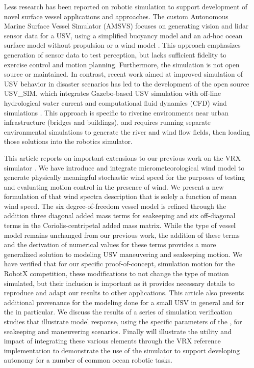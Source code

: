 \documentclass[utf8]{frontiersSCNS} %
\begin{document}
Less research has been reported on robotic simulation to support development of novel surface vessel applications and approaches. The custom Autonomous Marine Surface Vessel Simulator (AMSVS) focuses on generating vision and lidar sensor data for a USV, using a simplified buoyancy model and an ad-hoc ocean surface model without propulsion or a wind model \citep{smith19high}. This approach emphasizes generation of sensor data to test perception, but lacks sufficient fidelity to exercise control and motion planning. Furthermore, the simulation is not open source or maintained. In contrast, recent work aimed at improved simulation of USV behavior in disaster scenarios has led to the development of the open source USV\_SIM, which integrates Gazebo-based USV simulation with off-line hydrological water current and computational fluid dynamics (CFD) wind simulations \citep{paravisi2019unmanned}. This approach is specific to riverine environments near urban infrastructure (bridges and buildings), and requires running separate environmental simulations to generate the river and wind flow fields, then loading those solutions into the robotics simulator.


This article reports on important extensions to our previous work on the VRX simulator \citep{bingham19toward}.  We have introduce and integrate micrometeorological wind model to generate physically meaningful stochastic wind speed for the purposes of testing and evaluating motion control in the presence of wind.  We present a new formulation of that wind spectra description that is solely a function of mean wind speed. The six degree-of-freedom vessel model is refined through the addition three diagonal added mass terms for seakeeping and six off-diagonal terms in the Coriolis-centripetal added mass matrix.   While the type of vessel model remains unchanged from our previous work, the addition of these terms and the derivation of numerical values for these terms provides a more generalized solution to modeling USV maneuvering and seakeeping motion.  We have verified that for our specific proof-of-concept, simulation \wamv{} motion for the RobotX competition, these modifications to not change the type of motion simulated, but their inclusion is important as it provides necessary details to reproduce and adapt our results to other applications.  This article also presents additional provenance for the modeling done for a small USV in general and for the \wamv{} in particular.  We discuss the results of a series of simulation verification studies that illustrate model response, using the specific parameters of the \wamv, for seakeeping and maneuvering scenarios.  Finally will illustrate the utility and impact of integrating these various elements through the VRX reference implementation to demonstrate the use of the simulator to support developing autonomy for a number of common ocean robotic tasks.
\end{document}
